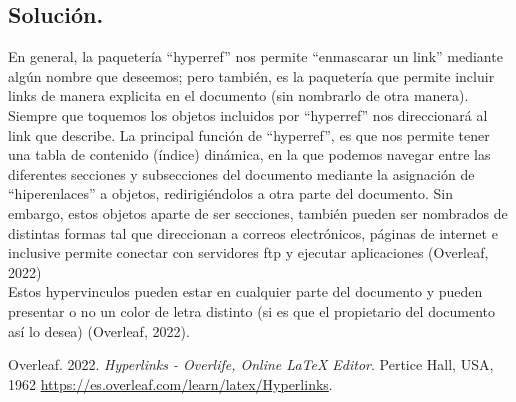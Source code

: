 \documentclass[letterpaper,12pt]{article}
\begin{document}
    \subsection*{Solución.}
    En general, la paquetería ``hyperref'' nos permite ``enmascarar un link'' mediante algún nombre que deseemos; pero también, es la paquetería que permite incluir links de manera explicita en el documento (sin nombrarlo de otra manera). Siempre que toquemos los objetos incluidos por ``hyperref'' nos direccionará al link que describe.
    La principal función de ``hyperref'', es que nos permite tener una tabla de contenido (índice) dinámica, en la que podemos navegar entre las diferentes secciones y subsecciones del documento mediante la asignación de ``hiperenlaces'' a objetos, redirigiéndolos a otra parte del documento. Sin embargo, estos objetos aparte de ser secciones, también pueden ser nombrados de distintas formas tal que direccionan a correos electrónicos, páginas de internet e inclusive permite conectar con servidores ftp y ejecutar aplicaciones (Overleaf, 2022)\\
    Estos hypervinculos pueden estar en cualquier parte del documento y pueden presentar o no un color de letra distinto (si es que el propietario del documento así lo desea) (Overleaf, 2022).
    
\begin{thebibliography}{}
\bibitem{} Overleaf. 2022. \textit{Hyperlinks - Overlife, Online LaTeX Editor}. Pertice Hall, USA, 1962 \url{https://es.overleaf.com/learn/latex/Hyperlinks}.
\end{thebibliography}


   
\end{document}
